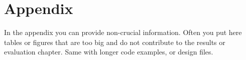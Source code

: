 \chapter{Appendix}%
\label{ch:appendix}

In the appendix you can provide non-crucial information.
Often you put here tables or figures that are too big and do not contribute to the results or evaluation chapter.
Same with longer code examples, or design files.